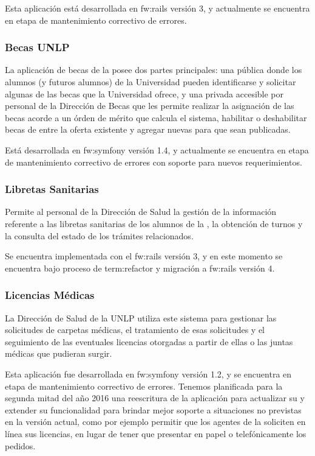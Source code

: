 Esta aplicación está desarrollada en \gls{fw:rails} versión 3, y actualmente se encuentra en etapa de mantenimiento correctivo de errores.


\subsubsection{Becas UNLP}
\label{anexo:detalle-clientes:becas}

La aplicación de becas de la {\unlp} posee dos partes principales: una pública donde los alumnos (y futuros alumnos) de la Universidad pueden identificarse y solicitar algunas de las becas que la Universidad ofrece, y una privada accesible por personal de la Dirección de Becas que les permite realizar la asignación de las becas acorde a un órden de mérito que calcula el sistema, habilitar o deshabilitar becas de entre la oferta existente y agregar nuevas para que sean publicadas.

Está desarrollada en \gls{fw:symfony} versión 1.4, y actualmente se encuentra en etapa de mantenimiento correctivo de errores con soporte para nuevos requerimientos.


\subsubsection{Libretas Sanitarias}
\label{anexo:detalle-clientes:libretas}

Permite al personal de la Dirección de Salud la gestión de la información referente a las libretas sanitarias de los alumnos de la {\unlp}, la obtención de turnos y la consulta del estado de los trámites relacionados.

Se encuentra implementada con el  \gls{fw:rails} versión 3, y en este momento se encuentra bajo proceso de \gls{term:refactor} y migración a \gls{fw:rails} versión 4.


\subsubsection{Licencias Médicas}
\label{anexo:detalle-clientes:licencias}

La Dirección de Salud de la UNLP utiliza este sistema para gestionar las solicitudes de carpetas médicas, el tratamiento de esas solicitudes y el seguimiento de las eventuales licencias otorgadas a partir de ellas o las juntas médicas que pudieran surgir.

Esta aplicación fue desarrollada en \gls{fw:symfony} versión 1.2, y se encuentra en etapa de mantenimiento correctivo de errores. Tenemos planificada para la segunda mitad del año 2016 una reescritura de la aplicación para actualizar su  y extender su funcionalidad para brindar mejor soporte a situaciones no previstas en la versión actual, como por ejemplo permitir que los agentes de la {\unlp} soliciten en línea sus licencias, en lugar de tener que presentar en papel o telefónicamente los pedidos.


